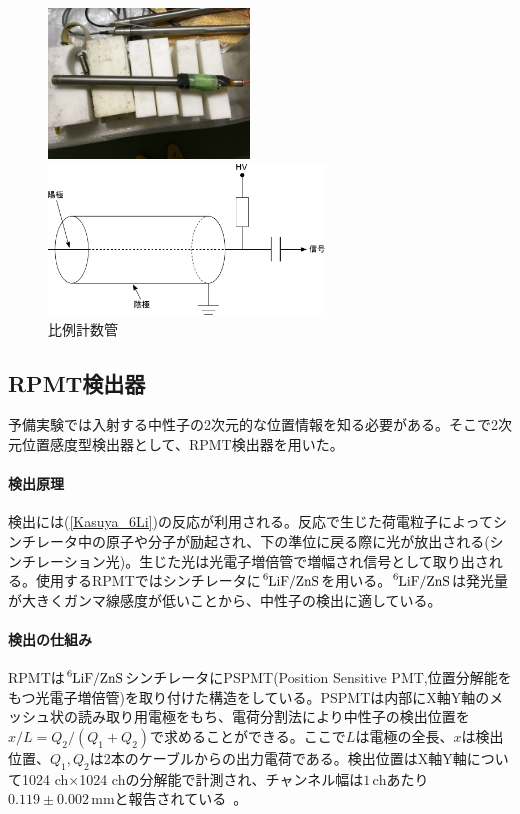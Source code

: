 \begin{figure}[h]
\begin{minipage}{0.5\hsize}
\begin{center}
\includegraphics[height=4cm]{detector/detector_photo1.jpg}
\end{center}
\end{minipage}
\begin{minipage}{0.5\hsize}
\begin{center}
\includegraphics[height=4cm]{detector/detector_fig1.pdf}
\end{center}
\end{minipage}
\caption{比例計数管}
\end{figure}

\subsection{RPMT検出器}
予備実験では入射する中性子の2次元的な位置情報を知る必要がある。そこで2次元位置感度型検出器として、RPMT検出器を用いた。

\paragraph{検出原理}
検出には(\ref{Kasuya_6Li})の反応が利用される。反応で生じた荷電粒子によってシンチレータ中の原子や分子が励起され、下の準位に戻る際に光が放出される(シンチレーション光)。生じた光は光電子増倍管で増幅され信号として取り出される。使用するRPMTではシンチレータに$\ce{^6LiF}/\ce{ZnS}$を用いる。$\ce{^6LiF}/\ce{ZnS}$は発光量が大きくガンマ線感度が低いことから、中性子の検出に適している。

\paragraph{検出の仕組み}
RPMTは$\ce{^6LiF}/\ce{ZnS}$シンチレータにPSPMT(Position Sensitive PMT,位置分解能をもつ光電子増倍管)を取り付けた構造をしている。PSPMTは内部にX軸Y軸のメッシュ状の読み取り用電極をもち、電荷分割法により中性子の検出位置を$x/L=Q_2/(Q_1+Q_2)$で求めることができる。ここで$L$は電極の全長、$x$は検出位置、$Q_1,Q_2$は2本のケーブルからの出力電荷である。検出位置はX軸Y軸について1024 ch$\times$1024 chの分解能で計測され、チャンネル幅は$1 \, \mathrm{ch}$あたり$0.119\pm0.002 \, \mathrm{mm}$と報告されている~\cite{KUANS_yamashita}。

